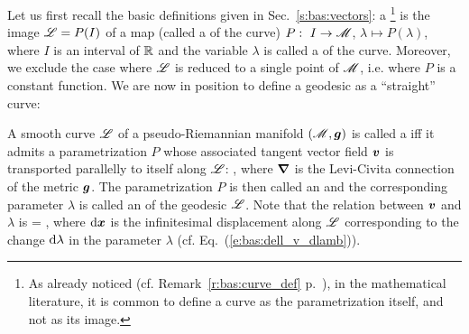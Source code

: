 Let us first recall the basic definitions given in Sec.~\ref{s:bas:vectors}:
a \footnote{As already noticed (cf. Remark~\ref{r:bas:curve_def} p.~\pageref{r:bas:curve_def}), in the mathematical literature, it is common to define
a curve as the parametrization itself, and not as its image.}
is the image $\mathscr{L}=P(I)$
of a map (called a  of the curve)
$P:\ I\rightarrow \mathscr{M}$, $\lambda\mapsto P(\lambda)$,
where $I$ is an interval of $\mathbb{R}$ and the variable $\lambda$ is called a
 of the curve.
Moreover, we exclude the case where $\mathscr{L}$ is reduced to a single point
of $\mathscr{M}$, i.e. where $P$ is a constant function.
We are now in position to define a geodesic as a ``straight'' curve:

\begin{greybox}
A smooth curve $\mathscr{L}$ of a pseudo-Riemannian manifold $(\mathscr{M},\bm{g})$ is
called a  iff it admits a parametrization $P$ whose associated
tangent vector field $\bm{v}$ is transported parallelly to itself along
$\mathscr{L}$:
\be \label{e:geo:geod_eq_v}
    ,
\ee
where $\bm{\nabla}$ is the Levi-Civita connection of the metric $\bm{g}$.
The parametrization $P$ is then called an
and the corresponding parameter $\lambda$ is called an
 of the
geodesic $\mathscr{L}$. Note that the relation between $\bm{v}$ and $\lambda$ is
\be \label{e:geo:v_dxdlambda}
     =  ,
\ee
where $\mathrm{d}\bm{x}$ is the infinitesimal displacement along $\mathscr{L}$ corresponding
to the change $\mathrm{d}\lambda$ in the parameter $\lambda$
(cf. Eq.~(\ref{e:bas:dell_v_dlamb})).
\end{greybox}

